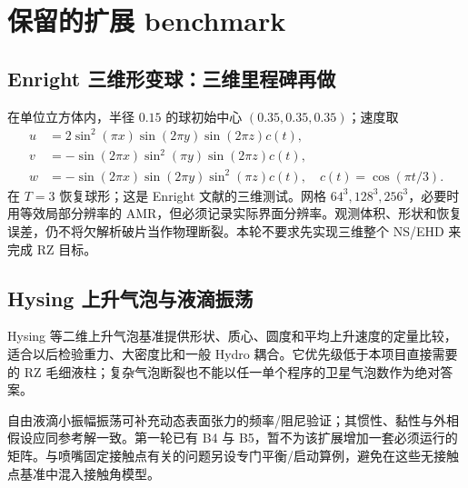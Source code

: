 \documentclass[11pt,a4paper]{article}
\begin{document}
\appendix
\clearpage
\section{保留的扩展 benchmark}
\subsection{Enright 三维形变球：三维里程碑再做}
在单位立方体内，半径 $0.15$ 的球初始中心 $(0.35,0.35,0.35)$；速度取
\begin{align}
u&=2\sin^2(\pi x)\sin(2\pi y)\sin(2\pi z)c(t),\\
v&=-\sin(2\pi x)\sin^2(\pi y)\sin(2\pi z)c(t),\\
w&=-\sin(2\pi x)\sin(2\pi y)\sin^2(\pi z)c(t),\quad c(t)=\cos(\pi t/3).
\end{align}
在 $T=3$ 恢复球形；这是 Enright 文献的三维测试\cite{enright2002}。网格 $64^3,128^3,256^3$，必要时用等效局部分辨率的 AMR，但必须记录实际界面分辨率。观测体积、形状和恢复误差，仍不将欠解析破片当作物理断裂。本轮不要求先实现三维整个 NS/EHD 来完成 RZ 目标。

\subsection{Hysing 上升气泡与液滴振荡}
Hysing 等二维上升气泡基准\cite{hysing2009}提供形状、质心、圆度和平均上升速度的定量比较，适合以后检验重力、大密度比和一般 Hydro 耦合。它优先级低于本项目直接需要的 RZ 毛细液柱；复杂气泡断裂也不能以任一单个程序的卫星气泡数作为绝对答案。

自由液滴小振幅振荡可补充动态表面张力的频率/阻尼验证；其惯性、黏性与外相假设应同参考解一致。第一轮已有 B4 与 B5，暂不为该扩展增加一套必须运行的矩阵。与喷嘴固定接触点有关的问题另设专门平衡/启动算例，避免在这些无接触点基准中混入接触角模型。
\end{document}
